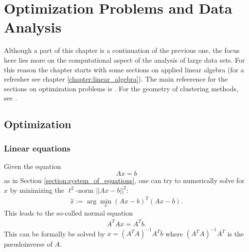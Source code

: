 \chapter{Optimization Problems and Data Analysis}

    Although a part of this chapter is a continuation of the previous one, the focus here lies more on the computational aspect of the analysis of large data sets. For this reason the chapter starts with some sections on applied linear algebra (for a refresher see chapter \ref{chapter:linear_algebra}). The main refeerence for the sections on optimization problems is \cite{conjugategradient}. For the geometry of clustering methods, see \cite{clustering_bregman}.

\section{Optimization}
\subsection{Linear equations}

    \begin{method}
        Given the equation \[Ax=b\] as in Section \ref{section:system_of_equations}, one can try to numerically solve for $x$ by minimizing the $\ell^2$-norm $||Ax-b||^2$:
        \begin{gather}
            \hat{x}:=\arg\min_x(Ax-b)^T(Ax-b).
        \end{gather}
        This leads to the so-called normal equation
        \begin{gather}
            \label{data:normal_equation}
            A^TAx = A^Tb.
        \end{gather}
        This can be formally be solved by $x=(A^TA)^{-1}A^Tb$ where $(A^TA)^{-1}A^T$ is the pseudoinverse of $A$.
    \end{method}

